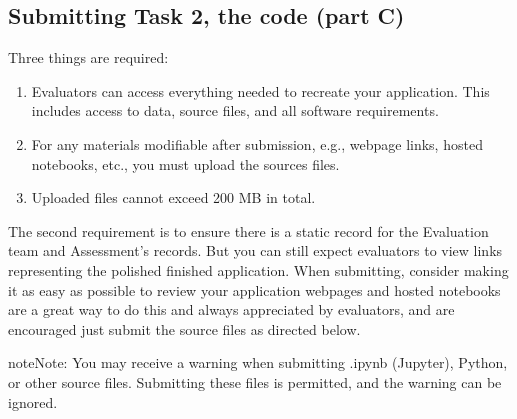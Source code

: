 \documentclass[letterpaper,10pt,english]{jupyterBook}
\begin{document}
\subsection{Submitting Task 2, the code (part C)}
\label{\detokenize{task2_doc/task2_doc_finish:submitting-task-2-the-code-part-c}}\label{\detokenize{task2_doc/task2_doc_finish:task2-doc-finish-how-to-submit-code}}
\sphinxAtStartPar
Three things are required:
\begin{enumerate}
%
\item {} 
\sphinxAtStartPar
Evaluators can access everything needed to recreate your application. This includes access to data, source files, and all software requirements.

\item {} 
\sphinxAtStartPar
For any materials modifiable after submission, e.g., webpage links, hosted notebooks, etc., you must upload the sources files.

\item {} 
\sphinxAtStartPar
Uploaded files cannot exceed 200 MB in total.

\end{enumerate}

\sphinxAtStartPar
The second requirement is to ensure there is a static record for the Evaluation team and Assessment’s records. But you can still expect evaluators to view links representing the polished finished application. When submitting, consider making it as easy as possible to review your application \sphinxhyphen{}webpages and hosted notebooks are a great way to do this and always appreciated by evaluators, and are encouraged \sphinxhyphen{}just submit the source files as directed below.

\begin{sphinxadmonition}{note}{Note:}
\sphinxAtStartPar
You may receive a warning when submitting .ipynb (Jupyter), Python, or other source files. Submitting these files is permitted, and the warning can be ignored.
\end{sphinxadmonition}
\end{document}
